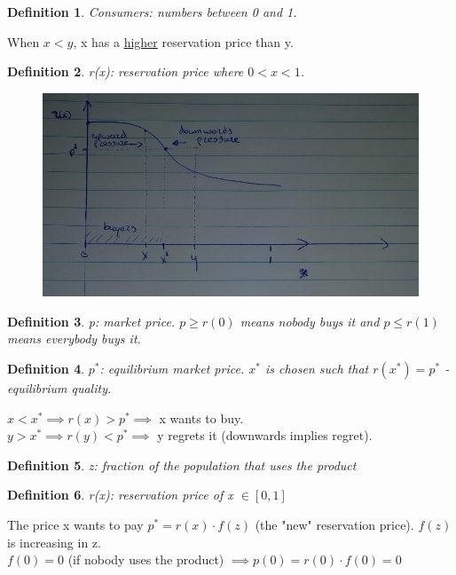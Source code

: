 \documentclass[12pt]{scrartcl}
\newtheorem{defi}{Definition}
\begin{document}
\begin{defi}
	Consumers: numbers between 0 and 1.
\end{defi}

When $x < y$, x has a \underline{higher} reservation price than y.
\begin{defi}
	r(x): reservation price where $0 < x < 1$.
\end{defi}

\begin{figure}[h]
	\centering
	\includegraphics[width=1\textwidth]{./images/graph_res_price.png}
\end{figure}

\begin{defi}
	p: market price. $p \geq r(0)$ means nobody buys it and $p \leq r(1)$ means everybody buys it.
\end{defi}

\begin{defi}
	$p^{*}$: equilibrium market price. $x^{*}$ is chosen such that $r(x^{*}) = p^{*}$ - equilibrium quality.
\end{defi}

\noindent $x < x^{*} \implies r(x) > p^{*} \implies$ x wants to buy.\\
$y > x^{*} \implies r(y) < p^{*} \implies$ y regrets it (downwards implies regret).\\

\begin{defi}
	z: fraction of the population that uses the product
\end{defi}
\begin{defi}
	r(x): reservation price of x $\in [0,1]$
\end{defi}
\noindent The price  x wants to pay $p^{*} = r(x)\cdot f(z)$ (the "new" reservation price). $f(z)$ is increasing in z.\\
$f(0) = 0$ (if nobody uses the product) $\implies p(0) = r(0)\cdot f(0) = 0$
\end{document}
